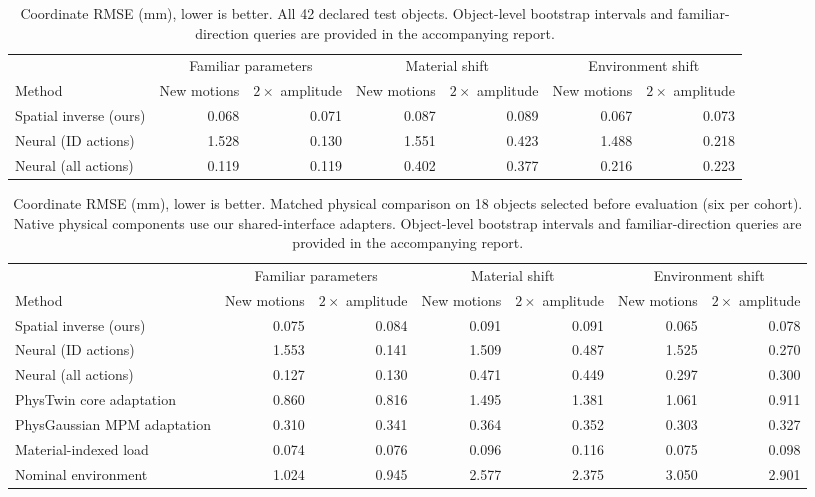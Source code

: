 \begin{table}[t]
\centering\small\setlength{\tabcolsep}{3pt}
\begin{tabular}{lrrrrrr}
\toprule
& \multicolumn{2}{c}{Familiar parameters} & \multicolumn{2}{c}{Material shift} & \multicolumn{2}{c}{Environment shift} \\
Method & New motions & $2\times$ amplitude & New motions & $2\times$ amplitude & New motions & $2\times$ amplitude \\
\midrule
Spatial inverse (ours) & 0.068 & 0.071 & 0.087 & 0.089 & 0.067 & 0.073 \\
Neural (ID actions) & 1.528 & 0.130 & 1.551 & 0.423 & 1.488 & 0.218 \\
Neural (all actions) & 0.119 & 0.119 & 0.402 & 0.377 & 0.216 & 0.223 \\
\bottomrule
\end{tabular}
\caption{Coordinate RMSE (mm), lower is better. All 42 declared test objects. Object-level bootstrap intervals and familiar-direction queries are provided in the accompanying report.}
\label{tab:main}
\end{table}
\begin{table}[t]
\centering\small\setlength{\tabcolsep}{3pt}
\begin{tabular}{lrrrrrr}
\toprule
& \multicolumn{2}{c}{Familiar parameters} & \multicolumn{2}{c}{Material shift} & \multicolumn{2}{c}{Environment shift} \\
Method & New motions & $2\times$ amplitude & New motions & $2\times$ amplitude & New motions & $2\times$ amplitude \\
\midrule
Spatial inverse (ours) & 0.075 & 0.084 & 0.091 & 0.091 & 0.065 & 0.078 \\
Neural (ID actions) & 1.553 & 0.141 & 1.509 & 0.487 & 1.525 & 0.270 \\
Neural (all actions) & 0.127 & 0.130 & 0.471 & 0.449 & 0.297 & 0.300 \\
PhysTwin core adaptation & 0.860 & 0.816 & 1.495 & 1.381 & 1.061 & 0.911 \\
PhysGaussian MPM adaptation & 0.310 & 0.341 & 0.364 & 0.352 & 0.303 & 0.327 \\
Material-indexed load & 0.074 & 0.076 & 0.096 & 0.116 & 0.075 & 0.098 \\
Nominal environment & 1.024 & 0.945 & 2.577 & 2.375 & 3.050 & 2.901 \\
\bottomrule
\end{tabular}
\caption{Coordinate RMSE (mm), lower is better. Matched physical comparison on 18 objects selected before evaluation (six per cohort). Native physical components use our shared-interface adapters. Object-level bootstrap intervals and familiar-direction queries are provided in the accompanying report.}
\label{tab:matched}
\end{table}
